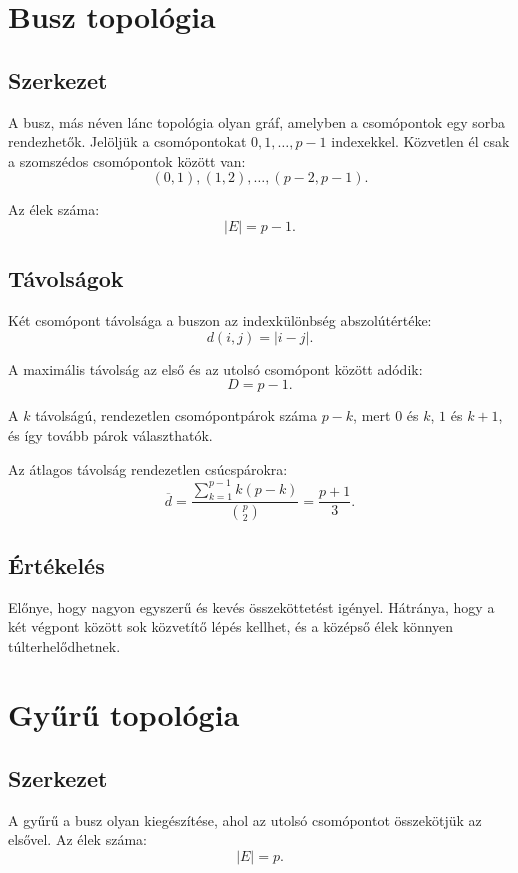 

\section{Busz topológia}

\subsection{Szerkezet}

A busz, más néven lánc topológia olyan gráf, amelyben a csomópontok egy sorba rendezhetők. Jelöljük a csomópontokat $0,1,\ldots,p-1$ indexekkel. Közvetlen él csak a szomszédos csomópontok között van:
\[
  (0,1),(1,2),\ldots,(p-2,p-1).
\]

Az élek száma:
\[
  |E|=p-1.
\]

\subsection{Távolságok}

Két csomópont távolsága a buszon az indexkülönbség abszolútértéke:
\[
  d(i,j)=|i-j|.
\]

A maximális távolság az első és az utolsó csomópont között adódik:
\[
  D=p-1.
\]

A $k$ távolságú, rendezetlen csomópontpárok száma $p-k$, mert $0$ és $k$, $1$ és $k+1$, és így tovább párok választhatók.

Az átlagos távolság rendezetlen csúcspárokra:
\[
  \overline d = \frac{\sum_{k=1}^{p-1} k(p-k)}{\binom{p}{2}} = \frac{p+1}{3}.
\]

\subsection{Értékelés}

Előnye, hogy nagyon egyszerű és kevés összeköttetést igényel. Hátránya, hogy a két végpont között sok közvetítő lépés kellhet, és a középső élek könnyen túlterhelődhetnek.

\section{Gyűrű topológia}

\subsection{Szerkezet}

A gyűrű a busz olyan kiegészítése, ahol az utolsó csomópontot összekötjük az elsővel. Az élek száma:
\[
  |E|=p.
\]

